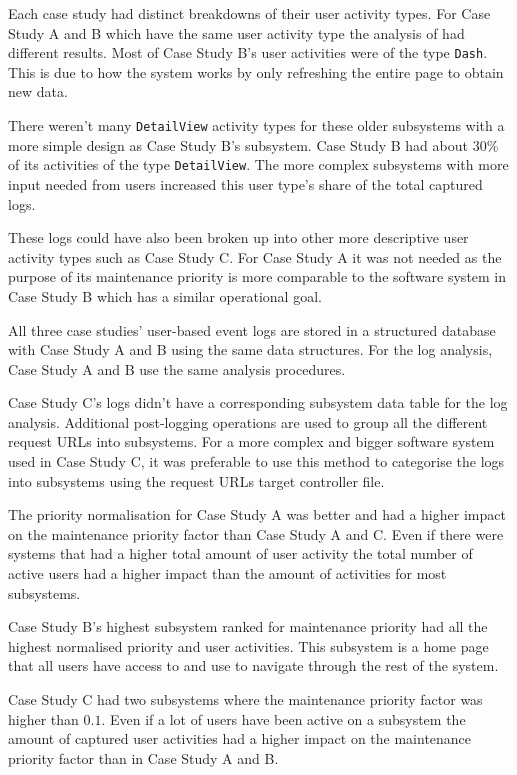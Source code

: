 Each case study had distinct breakdowns of their user activity types. For Case Study A and B which have the same user activity type the analysis of  had different results. Most of Case Study B's user activities were of the type \texttt{Dash}.  This is due to how the system works by only refreshing the entire page to obtain new data. \par There weren't many \texttt{DetailView} activity types for these older subsystems with a more simple design as Case Study B's subsystem. Case Study B had about $30\%$ of its activities of the type \texttt{DetailView}. The more complex subsystems with more input needed from users increased this user type's share of the total captured logs.\par These logs could have also been broken up into other more descriptive user activity types such as Case Study C. For Case Study A it was not needed as the purpose of its maintenance priority is more comparable to the software system in Case Study B which has a similar operational goal.\par All three case studies' user-based event logs are stored in a structured database with Case Study A and B using the same data structures. For the log analysis, Case Study A and B use the same analysis procedures. \par Case Study C's logs didn't have a corresponding subsystem data table for the log analysis. Additional post-logging operations are used to group all the different request URLs into subsystems. For a more complex and bigger software system used in Case Study C, it was preferable to use this method to categorise the logs into subsystems using the request URLs target controller file.\par The priority normalisation for Case Study A was better and had a higher impact on the maintenance priority factor than Case Study A and C. Even if there were systems that had a higher total amount of user activity the total number of active users had a higher impact than the amount of activities for most subsystems. \par Case Study B's highest subsystem ranked for maintenance priority had all the highest normalised priority and user activities. This subsystem is a home page that all users have access to and use to navigate through the rest of the system. \par Case Study C had two subsystems where the maintenance priority factor was higher than $0.1$. Even if a lot of users have been active on a subsystem the amount of captured user activities had a higher impact on the maintenance priority factor than in Case Study A and B.

